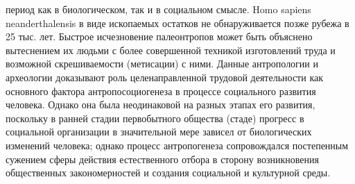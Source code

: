 \documentclass[12pt]{article}
\begin{document}
период как в биологическом, так и в социальном смысле. Homo sapiens neanderthalensis в виде ископаемых
остатков не обнаруживается позже рубежа в 25 тыс. лет. Быстрое исчезновение палеонтропов может быть
объяснено  вытеснением  их  людьми  с  более  совершенной  техникой  изготовлений  труда  и  возможной
скрешиваемости (метисации) с ними.
Данные антропологии и археологии доказывают роль целенаправленной трудовой деятельности как основного
фактора антропосоциогенеза в процессе социального развития человека. Однако она была неодинаковой на
разных этапах его развития, поскольку в ранней стадии первобытного общества (стаде) прогресс в социальной
организации в значительной мере зависел от биологических изменений человека; однако процесс антропогенеза
сопровождался  постепенным  сужением  сферы  действия  естественного  отбора  в  сторону  возникновения
общественных закономерностей и создания социальной и культурной среды.

\newpage
\end{document}
